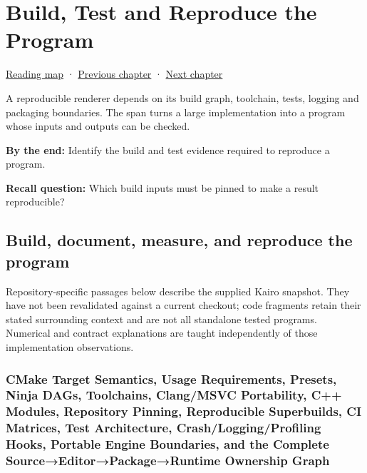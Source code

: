 \chapter{Build, Test and Reproduce the Program}\label{03-visual-computing-i-ch017-build-test-and-reproduce-the-program}\hypertarget{03-visual-computing-i-ch017}{}\label{stagechapter:03-visual-computing-i-ch017}

\hypertarget{03-visual-computing-i-ch017-build-test-and-reproduce-the-program}{}

\hyperref[volume-reading-map]{Reading map} · \hyperref[05-engine-i-ch007]{Previous chapter} · \hyperref[03-visual-computing-i-ch018-c-representation-ownership-and-lifetime]{Next chapter}

A reproducible renderer depends on its build graph, toolchain, tests, logging and packaging boundaries. The span turns a large implementation into a program whose inputs and outputs can be checked.

\textbf{By the end:} Identify the build and test evidence required to reproduce a program.

\textbf{Recall question:} Which build inputs must be pinned to make a result reproducible?

\section{Build, document, measure, and reproduce the program}\label{03-visual-computing-i-ch017-build-document-measure-and-reproduce-the-program}

\hypertarget{03-visual-computing-i-ch017-build-document-measure-and-reproduce-the-program}{}

Repository-specific passages below describe the supplied Kairo snapshot. They have not been revalidated against a current checkout; code fragments retain their stated surrounding context and are not all standalone tested programs. Numerical and contract explanations are taught independently of those implementation observations.

\subsection{CMake Target Semantics, Usage Requirements, Presets, Ninja DAGs, Toolchains, Clang/MSVC Portability, C++ Modules, Repository Pinning, Reproducible Superbuilds, CI Matrices, Test Architecture, Crash/Logging/Profiling Hooks, Portable Engine Boundaries, and the Complete Source→Editor→Package→Runtime Ownership Graph}\label{03-visual-computing-i-ch017-cmake-target-semantics-usage-requirements-presets-ninja-dags-toolchains-clangmsvc-portability-c-modules-repository-pinning-reproducible-superbuilds-ci-matrices-test-architecture-crashloggingprofiling-hooks-portable-engine-boundaries-and-the-complete-sourceeditorpackageruntime-ownership-graph}

